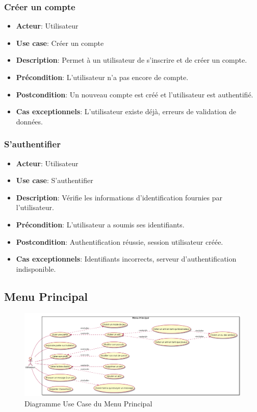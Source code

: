 \documentclass{article}
\begin{document}
\subsubsection*{Créer un compte}
\begin{itemize}
    \item \textbf{Acteur}: Utilisateur
    \item \textbf{Use case}: Créer un compte
    \item \textbf{Description}: Permet à un utilisateur de s’inscrire et de créer un compte.
    \item \textbf{Précondition}: L’utilisateur n’a pas encore de compte.
    \item \textbf{Postcondition}: Un nouveau compte est créé et l'utilisateur est authentifié.
    \item \textbf{Cas exceptionnels}: L'utilisateur existe déjà, erreurs de validation de données.
\end{itemize}

\subsubsection*{S'authentifier}
\begin{itemize}
    \item \textbf{Acteur}: Utilisateur
    \item \textbf{Use case}: S'authentifier
    \item \textbf{Description}: Vérifie les informations d'identification fournies par l'utilisateur.
    \item \textbf{Précondition}: L'utilisateur a soumis ses identifiants.
    \item \textbf{Postcondition}: Authentification réussie, session utilisateur créée.
    \item \textbf{Cas exceptionnels}: Identifiants incorrects, serveur d’authentification indisponible.
\end{itemize}
\newpage

\subsection{Menu Principal}

\begin{figure}
    \centering
    	\includegraphics[width=1.3\textwidth]{./uml/usescase/menu-principal/menu_principal.png}
    	\caption{Diagramme Use Case du Menu Principal}
    	\label{fig:main-menu}
    	
\end{figure}
\end{document}

